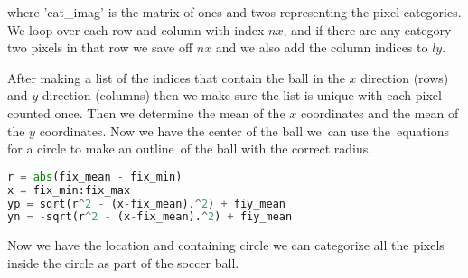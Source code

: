 where 'cat\_imag' is the matrix of ones and twos representing the pixel categories. We loop over each row and column with index $nx$, and if there are any category two pixels in that row we save off $nx$ and we also add the column indices to $ly$.

After making a list of the indices that contain the ball in the $x$ direction (rows) and $y$ direction (columns) then we make sure the list is unique with each pixel counted once. Then we determine the mean of the $x$ coordinates and the mean of the $y$ coordinates. Now we have the center of the ball we can use the equations for a circle to make an outline of the ball with the correct radius,

\begin{lstlisting}[language=Python]
r = abs(fix_mean - fix_min)
x = fix_min:fix_max
yp = sqrt(r^2 - (x-fix_mean).^2) + fiy_mean
yn = -sqrt(r^2 - (x-fix_mean).^2) + fiy_mean
\end{lstlisting}


Now we have the location and containing circle we can categorize all the pixels inside the circle as part of the soccer ball.
